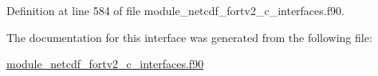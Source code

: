 Definition at line 584 of file module\+\_\+netcdf\+\_\+fortv2\+\_\+c\+\_\+interfaces.\+f90.



The documentation for this interface was generated from the following file\+:\begin{DoxyCompactItemize}
\item 
\hyperlink{module__netcdf__fortv2__c__interfaces_8f90}{module\+\_\+netcdf\+\_\+fortv2\+\_\+c\+\_\+interfaces.\+f90}\end{DoxyCompactItemize}
